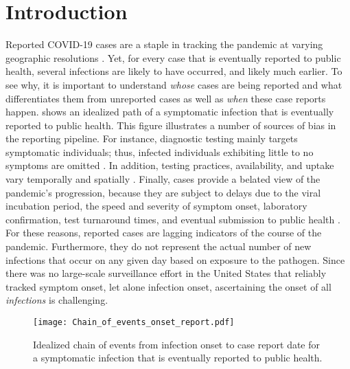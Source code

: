 \section{Introduction}
\label{sec:intro}

Reported COVID-19 cases are a staple in tracking the pandemic at varying
geographic resolutions \citep{dong2020interactive, nyt2020corona,
wp2020tracking}. Yet, for every case that is eventually reported to public
health, several infections are likely to have occurred, and likely much earlier.
To see why, it is important to understand \emph{whose} cases are being reported
and what differentiates them from unreported cases as well as \emph{when} these
case reports happen.  shows an idealized
path of a symptomatic infection that is eventually reported to public
health. This figure illustrates a number of sources of bias in the
reporting pipeline. For instance, diagnostic testing mainly targets symptomatic
individuals; thus, infected individuals exhibiting little to no symptoms are
omitted \citep{cdc2022estimated}. In addition, testing practices, availability,
and uptake vary temporally and spatially \citep{pitzer2021impact,
ecdc2020strategies, hitchings2021usefulness}. Finally, cases provide a belated
view of the pandemic's progression, because they are subject to delays due to
the viral incubation period, the speed and severity of symptom onset, laboratory
confirmation, test turnaround times, and eventual submission to public health
\citep{pellis2021challenges, wash2020dash}. For these reasons, reported cases
are lagging indicators of the course of the pandemic. Furthermore, they do not
represent the actual number of new infections that occur on any given day based on
exposure to the pathogen. Since there was no large-scale surveillance effort in
the United States that reliably tracked symptom onset, let alone infection
onset, ascertaining the onset of all \emph{infections} is challenging.

\begin{figure}[H]
\centering
    \texttt{[image: Chain\_of\_events\_onset\_report.pdf]} 
    \caption{Idealized chain of events from infection onset to case report date 
    for a symptomatic infection that is eventually reported to public health.}
    \label{fig:chain_events_onset_report}
\end{figure}


